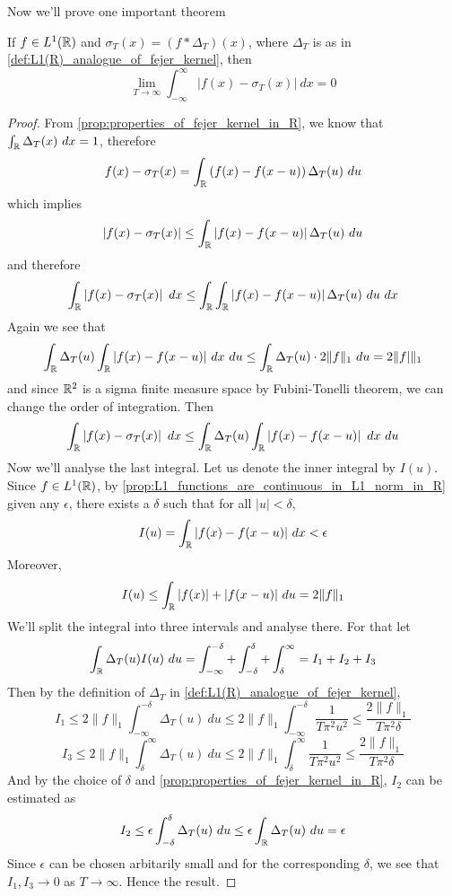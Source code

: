 Now we'll prove one important theorem
\begin{theorem}
  If $f\in L^1(\mathbb R)$ and $\sigma_T(x) = (f*\Delta_T)(x)$, where $\Delta_T$ is as in \autoref{def:L1(R)_analogue_of_fejer_kernel}, then $$\lim_{T\to \infty} \int_{-\infty}^{\infty}|f(x) - \sigma_T(x)| \ dx = 0$$
\end{theorem}
\begin{proof}
  From \autoref{prop:properties_of_fejer_kernel_in_R}, we know that $\int_\mathbb R \Delta_T(x) \ dx = 1$, therefore $$f(x) - \sigma_T(x) = \int_\mathbb R \left(f(x) - f(x-u)\right) \Delta_T(u) \ du$$
  which implies $$\left|f(x)-\sigma_T(x)\right| \le \int_\mathbb R \left|f(x) - f(x-u)\right| \Delta_T(u) \ du$$
  and therefore $$\int_\mathbb R \left|f(x)-\sigma_T(x)\right| \ dx \le \int_\mathbb R \int_\mathbb R \left|f(x) - f(x-u)\right| \Delta_T(u) \ du \ dx$$
  Again we see that $$\int_\mathbb R \Delta_T(u) \int_\mathbb R |f(x) - f(x-u)| \ dx \ du \le \int_\mathbb R \Delta_T(u) \cdot 2\|f\|_1 \ du = 2\|f|\|_1$$
  and since $\mathbb R^2$ is a sigma finite measure space by Fubini-Tonelli theorem, we can change the order of integration. Then $$\int_\mathbb R \left|f(x)-\sigma_T(x)\right| \ dx \le \int_\mathbb R \Delta_T(u) \int_\mathbb R \left|f(x) - f(x-u)\right|  \ dx \ du$$
  Now we'll analyse the last integral. Let us denote the inner integral by $I(u)$. Since $f\in L^1(\mathbb R)$, by \autoref{prop:L1_functions_are_continuous_in_L1_norm_in_R} given any $\epsilon$, there exists a $\delta$ such that for all $|u| < \delta$, $$I(u) = \int_\mathbb R |f(x) - f(x-u)| \ dx < \epsilon$$
  Moreover, $$I(u) \le \int_\mathbb R |f(x)| + |f(x-u)| \ du = 2\|f\|_1$$
  We'll split the integral into three intervals and analyse there. For that let $$\int_\mathbb R \Delta_T(u) I(u) \ du = \int_{-\infty}^{-\delta}+ \int_{-\delta}^{\delta} + \int^{\infty}_{\delta} = I_1 + I_2 + I_3$$
  Then by the definition of $\Delta_T$ in \autoref{def:L1(R)_analogue_of_fejer_kernel},
  $$I_1 \le 2\|f\|_1 \int_{-\infty}^{-\delta} \Delta_T(u) \ du \le 2\|f\|_1\int_{-\infty}^{-\delta} \frac{1}{T\pi^2 u^2} \le \frac{2\|f\|_1}{T\pi^2 \delta}$$ $$I_3 \le 2\|f\|_1 \int^{\infty}_{\delta} \Delta_T(u) \ du \le 2\|f\|_1\int^{\infty}_{\delta} \frac{1}{T\pi^2 u^2} \le \frac{2\|f\|_1}{T\pi^2 \delta}$$
  And by the choice of $\delta$ and \autoref{prop:properties_of_fejer_kernel_in_R}, $I_2$ can be estimated as $$I_2 \le \epsilon \int_{-\delta}^\delta \Delta_T(u) \ du \le \epsilon \int_\mathbb R \Delta_T(u) \ du = \epsilon$$
  Since $\epsilon$ can be chosen arbitarily small and for the corresponding $\delta$, we see that $I_1, I_3 \to 0$ as $T\to \infty$. Hence the result.
\end{proof}


